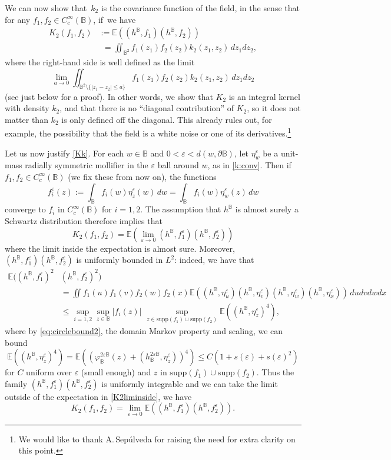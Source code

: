 \documentclass[10pt]{amsart}
\let\ts\textstyle
\theoremstyle{definition}
\newcommand{\E}{\mathbb{E}}
\newcommand{\B}{\mathbb{B}}\let\D\B\let\Ub\B
\let\eps\varepsilon
\begin{document}
We can now show that~$k_2$ is the covariance function of the field, in the sense that for any $f_1,f_2 \in C_c^\infty(\B)$, if~we have
\[
\begin{aligned}\label{Kk}K_2(f_1,f_2)& := \mathbb{E}((h^{\D},f_1)(h^\D,f_2)) \\
& \phantom{:}=\iint_{\B^2} f_1(z_1)f_2(z_2)k_2(z_1,z_2) \, dz_1 dz_2,\end{aligned}
\]
where the right-hand side is well defined as the limit
\begin{equation}\label{eq:Kklimit}\lim_{a\to 0}\iint_{\B^2\setminus\{|z_1-z_2|\le a\}} f_1(z_1)f_2(z_2)k_2(z_1,z_2) \, dz_1 dz_2\end{equation}
(see just below for a proof). In other words, we show that $K_2$ is an integral kernel with density $k_2$, and that there is no ``diagonal contribution'' of $K_2$, so it does not matter than $k_2$ is only defined off the diagonal. This already rules out, for example, the possibility that the field is a white noise or one of its derivatives.\footnote{We would like to thank A.\,Sepúlveda for raising the need for extra clarity on this point.}

Let us now justify \eqref{Kk}. For each $w\in \D$ and $0<\eps<d(w,\partial \B)$, let $\eta_{w}^\eps$ be a unit-mass radially symmetric mollifier in the $\eps$ ball around $w$, as in \eqref{k:conv}.
Then if $f_1,f_2\in C_c^\infty(\B)$ (we fix these from now on),
the functions
\[
f_i^\eps(z):= \int_{\B} f_i(w)\eta_{z}^\eps(w) \, dw =\int_{\B} f_i(w) \eta_w^\eps(z) \, dw
\]
converge to $f_i$ in $C_c^\infty(\D)$ for $i=1,2$. The assumption that $h^\D$ is almost surely a Schwartz distribution therefore implies that
\begin{equation}\label{K2liminside}
\ts
K_2(f_1,f_2)=\mathbb{E}(\lim_{\eps\to 0} (h^{
\D},f_1^\eps)(h^{\B},f_2^\eps))\end{equation}
where the limit inside the expectation is almost sure. Moreover, $(h^{\D},f_1^\eps)(h^{\D},f_2^\eps)$ is uniformly bounded in $L^2$: indeed, we have that
\begin{align*}
\mathbb{E}((h^{\D},f_1^\eps)^2&(h^{\D},f_2^\eps)^2)\\
& = \iint f_1(u)f_1(v)f_2(w)f_2(x)\mathbb{E}((h^{\D},\eta_u^\eps)(h^{\D},\eta_v^\eps)(h^\D,\eta_w^\eps)(h^\D,\eta_x^\eps)) \, du dv dw dx \\ & \le \sup_{i=1,2}\sup_{z\in \B} |f_i(z)| \, \, \sup_{z\in \mathrm{supp}(f_1)\cup \mathrm{supp}(f_2)} \mathbb{E}((h^{\B}, \eta_z^\eps)^4),
\end{align*}
where by \eqref{eq:circlebound2}, the domain Markov property and scaling, we can bound
\[
\E((h^\B,\eta_{z}^\eps)^4)=\E((\varphi_\B^{2\eps\B}(z)+(h_\B^{2\eps\B},\eta_z^\eps))^4)\le C(1+s(\eps)+s(\eps)^2)
\]
for $C$ uniform over $\eps$ (small enough) and $z$ in $\mathrm{supp}(f_1)\cup \mathrm{supp}(f_2)$. Thus the family $(h^{\D},f_1^\eps)(h^{\D},f_2^\eps)$ is uniformly integrable and we can take the limit outside of the expectation in \eqref{K2liminside}, \ie we have
\begin{equation}\label{K2limoutside} K_2(f_1,f_2)=\lim_{\eps\to 0} \mathbb{E}((h^{
\D},f_1^\eps)(h^{\B},f_2^\eps)).
\end{equation}
\end{document}
